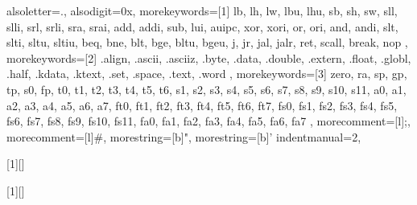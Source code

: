 \lstset{
	basicstyle=\ttfamily,  %
	breaklines=false,       %
	numbers=left,          %
	numberstyle=\tiny,     %
	showspaces=false,      %
	showstringspaces=false,%
	showtabs=false,        %
	tabsize=2              %
}



{
	alsoletter={.}, %
	alsodigit={0x}, %
	morekeywords=[1]{ %
			lb, lh, lw, lbu, lhu,
			sb, sh, sw,
			sll, slli, srl, srli, sra, srai,
			add, addi, sub, lui, auipc,
			xor, xori, or, ori, and, andi,
			slt, slti, sltu, sltiu,
			beq, bne, blt, bge, bltu, bgeu,
			j, jr, jal, jalr, ret,
			scall, break, nop
		},
	morekeywords=[2]{ %
			.align, .ascii, .asciiz, .byte, .data, .double, .extern,
			.float, .globl, .half, .kdata, .ktext, .set, .space, .text, .word
		},
	morekeywords=[3]{ %
			zero, ra, sp, gp, tp, s0, fp,
			t0, t1, t2, t3, t4, t5, t6,
			s1, s2, s3, s4, s5, s6, s7, s8, s9, s10, s11,
			a0, a1, a2, a3, a4, a5, a6, a7,
			ft0, ft1, ft2, ft3, ft4, ft5, ft6, ft7,
			fs0, fs1, fs2, fs3, fs4, fs5, fs6, fs7, fs8, fs9, fs10, fs11,
			fa0, fa1, fa2, fa3, fa4, fa5, fa6, fa7
		},
	morecomment=[l]{;},   %
	morecomment=[l]{\#},  %
	morestring=[b]",      %
	morestring=[b]'       %
	indentmanual=2,
}

[1][]
{
}
{}

{
}
{}

[1][]
{
}
{}
